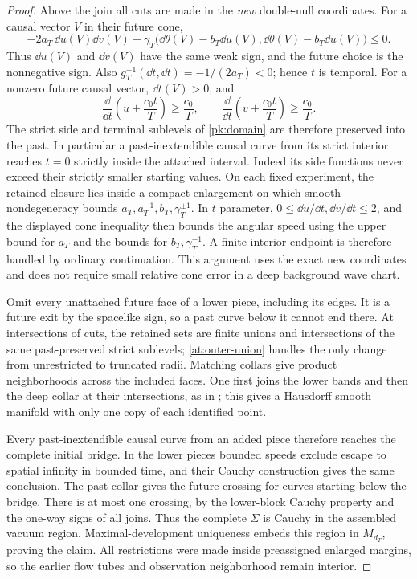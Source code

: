 \begin{proof}
Above the join all cuts are made in the \emph{new} double-null
coordinates. For a causal vector $V$ in their future cone,
\[
 -2a_T\,\dd u(V)\dd v(V)
 +\gamma_T\bigl(\dd\theta(V)-b_T\dd u(V),
                  \dd\theta(V)-b_T\dd u(V)\bigr)\le0.
\]
Thus $\dd u(V)$ and $\dd v(V)$ have the same weak sign, and
the future choice is the nonnegative sign. Also
$g_T^{-1}(\dd t,\dd t)=-1/(2a_T)<0$; hence $t$ is temporal.
For a nonzero future causal vector, $\dd t(V)>0$, and
\begin{equation}\label{at:deep-exits}
 \frac{\dd}{\dd t}\left(u+\frac{c_0t}{T}\right)
       \ge\frac{c_0}{T},\qquad
 \frac{\dd}{\dd t}\left(v+\frac{c_0t}{T}\right)
       \ge\frac{c_0}{T}.
\end{equation}
The strict side and terminal sublevels of \eqref{pk:domain}
are therefore preserved into the past. In particular a past-inextendible
causal curve from its strict interior reaches $t=0$ strictly inside the
attached interval. Indeed its side functions never exceed their
strictly smaller starting values. On each fixed experiment, the retained
closure lies inside a compact enlargement on which smooth nondegeneracy
bounds $a_T,a_T^{-1},b_T,\gamma_T^{\pm1}$. In $t$ parameter,
$0\le\dd u/\dd t,\dd v/\dd t\le2$, and the displayed cone inequality
then bounds the angular speed using the upper bound for $a_T$ and the
bounds for $b_T,\gamma_T^{-1}$. A finite interior endpoint is therefore
handled by ordinary continuation. This
argument uses the exact new coordinates and does not require
small relative cone error in a deep background wave chart.

Omit every unattached future face of a lower piece, including
its edges. It is a future exit by the spacelike sign, so a past
curve below it cannot end there. At intersections of cuts, the
retained sets are finite unions and intersections of the same
past-preserved strict sublevels; \eqref{at:outer-union} handles
the only change from unrestricted to truncated radii. Matching
collars give product neighborhoods across the included faces.
One first joins the lower bands and then the deep collar at
their intersections, as in \cite[]{KerrCTwo}; this
gives a Hausdorff smooth manifold with only one copy of each
identified point.

Every past-inextendible causal curve from an added piece therefore reaches
the complete initial bridge. In the lower pieces bounded speeds
exclude escape to spatial infinity in bounded time, and their
Cauchy construction gives the same conclusion. The past collar
gives the future crossing for curves starting below the bridge.
There is at most one crossing, by the lower-block Cauchy property
and the one-way signs of all joins. Thus the complete $\Sigma$
is Cauchy in the assembled vacuum region. Maximal-development
uniqueness embeds this region in $M_{d_T}$, proving the claim.
All restrictions were made inside preassigned enlarged margins,
so the earlier flow tubes and observation neighborhood remain
interior.
\end{proof}

